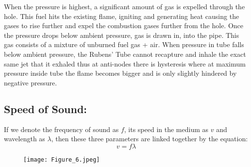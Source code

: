 \documentclass[12pt,a4paper]{article}
\begin{document}
\begin{figure}[!ht]
	\begin{center}
	\end{center}
\end{figure}
\clearpage
\noindent
When the pressure is highest, a significant amount of gas is expelled through the hole. This fuel hits the existing flame, igniting and generating heat causing the gases to rise further and expel the combustion gases further from the hole. Once the pressure drops below ambient pressure, gas is drawn in, into the pipe. This gas consists of a mixture of unburned fuel gas + air. When pressure in tube falls below ambient pressure, the Rubens’ Tube cannot recapture and inhale the exact same jet that it exhaled thus at anti-nodes there is hysteresis where at maximum pressure inside tube the flame becomes bigger and is only slightly hindered by negative pressure.
\subsection{Speed of Sound:}
If we denote the frequency of sound as $f$, its speed in the medium as $v$ and wavelength as $\lambda$, then these three parameters are linked together by the equation:\\
\begin{equation}
    \text{$v$} = \text{$f$} \text{$\lambda$}
\end{equation}
\begin{figure}[!ht]
	\begin{center}
		\texttt{[image: Figure\_6.jpeg]}
	\end{center}
\end{figure}
\end{document}
